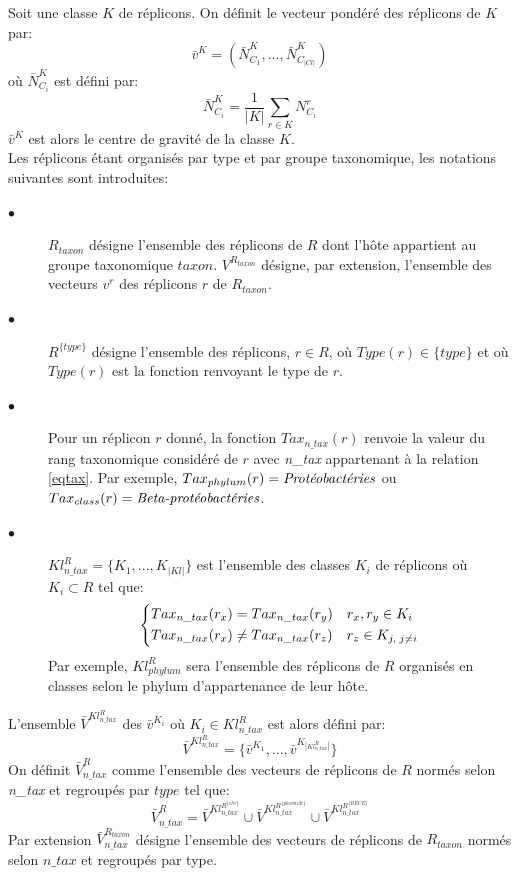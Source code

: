 Soit une classe $K$ de réplicons. On  définit le vecteur pondéré des réplicons de $K$ par:
	\begin{equation}
	\bar{v}^{K}=(\bar{N}^{K}_{C_{1}},...,\bar{N}^{K}_{C_{|Cl|}})
	\end{equation}
où $\bar{N}^{K}_{C_{i}}$ est défini par:
	\begin{equation}
	\bar{N}^{K}_{C_{i}}=\frac{1}{|K|}\sum_{r \in K}N^{r}_{C_{i}}
	\end{equation}
$\bar{v}^{K}$ est alors le centre de gravité de la classe $K$.\\
Les réplicons étant organisés par type et par groupe taxonomique, les notations suivantes sont introduites:
\begin{description} 
\item[$\bullet$] $R_{taxon}$ désigne l'ensemble des réplicons de $R$ dont l'hôte appartient au groupe taxonomique $taxon$. $V^{R_{taxon}}$ désigne, par extension, l'ensemble des vecteurs $v^{r}$ des réplicons $r$ de $R_{taxon}$. 
\item[$\bullet$] $R^{\{type\}}$ désigne l'ensemble des réplicons, $r \in R$, où $Type(r) \in \{type\}$ et où $Type(r)$ est la fonction renvoyant le type de $r$.
\item[$\bullet$]  Pour un réplicon $r$ donné, la fonction $Tax_{n\_tax}(r)$ renvoie la valeur du rang taxonomique considéré de $r$ avec \textit{n\_tax} appartenant à la relation \ref{eqtax}. Par exemple, $Tax_{phylum}(r)=\text{\textit{Protéobactéries}}$ ou $Tax_{class}(r)=\text{\textit{Beta-protéobactéries}}$.
\item[$\bullet$] $Kl_{n\_tax}^{R}=\{K_{1},...,K_{|Kl|}\}$ est  l'ensemble des classes $K_{i}$ de réplicons où $K_{i} \subset  R$  tel que:
	 $$\begin{dcases}
	   Tax_{n\_tax}(r_{x})=Tax_{n\_tax}(r_{y}) &  r_{x},r_{y} \in K_{i}\\
	   Tax_{n\_tax}(r_{x})\neq Tax_{n\_tax}(r_{z}) &  r_{z} \in K_{j,\; j\neq i}\\
	  \end{dcases}
	   $$ 
Par exemple, $Kl_{phylum}^{R}$ sera l'ensemble des réplicons de $R$ organisés en classes selon le phylum d'appartenance de leur hôte.
\end{description}
	    
L'ensemble $\bar{V}^{Kl_{n\_tax}^{R}}$ des $\bar{v}^{K_{i}}$  où $K_{i} \in Kl_{n\_tax}^{R}$ est alors défini par:
	    \begin{equation}
	    \bar{V}^{Kl_{n\_tax}^{R}}=\{\bar{v}^{K_{1}},...,\bar{v}^{K_{|Kl_{n\_tax}^{R}|}} \}
	    \end{equation}
On définit $\bar{V}^{R}_{n\_tax}$ comme l'ensemble des vecteurs de réplicons de $R$ normés selon \textit{n\_tax} et regroupés par $type$ tel que:
	     \begin{equation}\label{eqVnorm}
	     \bar{V}^{R}_{n\_tax}= \bar{V}^{Kl_{n\_tax}^{R^{ \{chr\} }}} \cup \bar{V}^{Kl_{n\_tax}^{R^{ \{plasmide\} }}} \cup \bar{V}^{Kl_{n\_tax}^{R^{ \{RECE\} }}}
	     \end{equation}
Par extension $\bar{V}^{R_{taxon}}_{n\_tax}$ désigne l'ensemble des vecteurs de réplicons de $R_{taxon}$ normés selon $n\_tax$ et regroupés par type.\\

